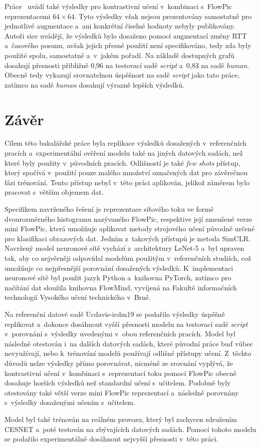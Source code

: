 Práce~\cite{flowpic_augmentations} uvádí také výsledky pro kontrastivní učení v~kombinaci s~FlowPic reprezentacemi $64\times64$. Tyto výsledky však nejsou prezentovány samostatně pro jednotlivé augmentace a~ani konkrétní číselné hodnoty nebyly publikovány. Autoři sice uvádějí, že výsledků bylo dosaženo pomocí augmentací změny RTT a~časového posunu, avšak jejich přesné použití není specifikováno, tedy zda byly použité spolu, samostatně a~v~jakém pořadí. Na základě dostupných grafů dosahují přesnosti přibližně 0,96 na testovací sadě \textit{script} a~0,83 na sadě \textit{human}. Obecně tedy vykazují srovnatelnou úspěšnost na sadě \textit{script} jako tato práce, zatímco na sadě \textit{human} dosahují výrazně lepších výsledků.
\chapter{Závěr}
Cílem této bakalářské práce byla replikace výsledků dosažených v~referenčních pracích a~experimentální ověření modelu také na jiných datových sadách, než které byly použity v~původních pracích. Odlišností je také \textit{few shots} přístup, který spočívá v~použití pouze malého množství označených dat pro závěrečnou fázi trénování. Tento přístup nebyl v~této práci aplikován, jelikož záměrem bylo pracovat s~větším objemem dat. 

Specifikem navrženého řešení je reprezentace síťového toku ve formě dvourozměrného histogramu nazývaného FlowPic, respektive její zmenšené verze mini FlowPic, která umožňuje aplikovat metody strojového učení původně určené pro klasifikaci obrazových dat. Jedním z~takových přístupů je metoda SimCLR. Navržený model neuronové sítě vychází z~architektury LeNet-5 a~byl upraven tak, aby co nejvěrněji odpovídal modelům použitým v~referenčních studiích, což umožňuje co nejpřesnější porovnání dosažených výsledků. K~implementaci neuronové sítě byl použit jazyk Python a~knihovna PyTorch, zatímco pro načítání dat sloužila knihovna FlowMind, vyvíjená na Fakultě informačních technologií Vysokého učení technického v~Brně.

Na referenční datové sadě Ucdavis-icdm19 se podařilo výsledky úspěšně replikovat a~dokonce dosáhnout vyšší přesnosti modelu na testovací sadě \textit{script} v~porovnání s~výsledky uvedenými v~obou referenčních pracích. Model byl následně otestován i~na dalších datových sadách, které původní práce buď vůbec nevyužívají, nebo k~trénování modelů používají odlišné přístupy učení. Z~těchto důvodů nelze výsledky přímo porovnávat, nicméně ze srovnání vyplývá, že kontrastivní učení v~kombinaci s~reprezentací toku pomocí FlowPic obecně dosahuje horších výsledků než standardní učení s~učitelem. Podobně byly otestovány také větší verze mini FlowPic reprezentací a~následně porovnány s~výsledky dosaženými učením s~učitelem.

Model byl také trénován na reálném provozu, který byl zachycen sdružením CESNET a~poté testován na zbývajících datových sadách. Pomocí tohoto modelu se podařilo experimentálně dosáhnout nejvyšší přesnosti v~této práci.